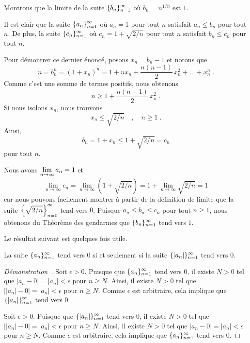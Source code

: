 {\begin{egg}[\theory\ \eng]
Montrons que la limite de la suite
$\displaystyle \{ b_n\}_{n=1}^\infty$ où $b_n = n^{1/n}$ est $1$.

Il est clair que la suite
$\displaystyle \{ a_n\}_{n=1}^\infty$ où $a_n = 1$ pour tout
$n$ satisfait $a_n \leq b_n$ pour tout $n$.  De plus, la suite
$\displaystyle \{ c_n\}_{n=1}^\infty$ où $c_n = 1+\sqrt{2/n}$ pour
tout $n$ satisfait $b_n \leq  c_n$ pour tout $n$.

Pour démontrer ce dernier énoncé, posons $x_n = b_n-1$ et
notons que
\[
n = b_n^n = (1+x_n)^n
= 1 + nx_n + \frac{n(n-1)}{2}\,x_n^2 + \ldots + x_n^n \; .
\]
Comme c'est une somme de termes positifs, nous obtenons
\[
n \geq 1 + \frac{n(n-1)}{2}\,x_n^2 \; .
\]
Si nous isolons $x_n$, nous trouvons
\[
x_n \leq \sqrt{2/n} \quad , \quad n \geq 1 \; .
\]
Ainsi,
\[
b_n = 1 + x_n \leq 1 + \sqrt{2/n} = c_n
\]
pour tout $n$.

Nous avons $\displaystyle \lim_{n\rightarrow \infty} a_n = 1$ et
\[
\lim_{n\rightarrow \infty} c_n = \lim_{n\rightarrow \infty}
\left(1+ \sqrt{2/n} \right) = 1 + \lim_{n\rightarrow \infty} \sqrt{2/n} = 1
\]
car nous pouvons facilement montrer à partir de la définition de limite que
la suite $\displaystyle \left\{ \sqrt{2/n} \right\}_{n=0}^\infty$ tend
vers $0$.  Puisque $a_n \leq b_n \leq c_n$ pour tout $n \geq 1$, nous
obtenons du Théorème des gendarmes que
$\displaystyle \{ b_n\}_{n=1}^\infty$ tend vers $1$.
\end{egg}

Le résultat suivant est quelques fois utile.

\begin{theorem}
La suite $\displaystyle \{ a_n\}_{n=1}^\infty$ tend vers $0$ si et
seulement si la suite $\displaystyle \{ |a_n| \}_{n=1}^\infty$ tend vers
$0$. \label{suiteAbs}
\end{theorem}

\begin{proof}[Démonstration\ \theory]
\subQ{$\Rightarrow$} Soit $\epsilon>0$. Puisque que
$\displaystyle \{ a_n\}_{n=1}^\infty$ 
tend vers $0$, il existe $N>0$ tel que $|a_n- 0 | = |a_n| <\epsilon$
pour $n\geq N$.  Ainsi, il existe $N>0$ tel que
$\big| |a_n|- 0 \big| = |a_n| <\epsilon$ pour $n\geq N$.  Comme
$\epsilon$ est arbitraire, cela implique que
$\displaystyle \{|a_n|\}_{n=1}^\infty$ tend vers $0$.

\subQ{$\Leftarrow$} Soit $\epsilon>0$. Puisque que
$\displaystyle \{ |a_n|\}_{n=1}^\infty$ tend vers $0$, il existe $N>0$
tel que $\big| |a_n|- 0 \big| = |a_n| <\epsilon$ pour $n\geq N$.
Ainsi, il existe $N>0$ tel que $|a_n- 0| = |a_n| <\epsilon$ pour
$n\geq N$.  Comme $\epsilon$ est arbitraire, cela implique que
$\displaystyle \{a_n\}_{n=1}^\infty$ tend vers $0$.
\end{proof}

}

